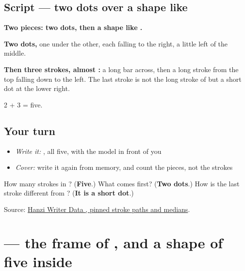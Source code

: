 \subsection*{Script — two dots over a shape like }

\begin{quote}
\end{quote}

\textbf{Two pieces: two dots, then a shape like .}

\textbf{Two dots,} one under the other, each falling to the right, a little left of the middle.

\textbf{Then three strokes, almost :} a long bar across, then a long stroke from the top falling down to the left. The last stroke is not the long stroke of  but a short dot at the lower right.

2 + 3 = five.

\subsection*{Your turn}
\begin{itemize}
\raggedright
  \item \emph{Write it:} , all five, with the model in front of you
  \item \emph{Cover:} write it again from memory, and count the pieces, not the strokes
\end{itemize}

\begin{tcolorbox}[breakable,colback=teal!4,colframe=teal!35!black,title={Before you move on}]
How many strokes in ? (\textbf{Five}.) What comes first? (\textbf{Two dots}.) How is the last stroke different from ? (\textbf{It is a short dot}.)

Source: \href{https://raw.githubusercontent.com/chanind/hanzi-writer-data/68d10a4b21150cae5e1ebbd223eed289cf32d90c/data/\%E5\%A4\%B4.json}{Hanzi Writer Data , pinned stroke paths and medians}.
\end{tcolorbox}
\section[\texorpdfstring{\zh{疼} (téng)}{疼 (téng)}]{ — the frame of , and a shape of five inside}

\label{lesson:ZH-W228-teng-ache}



